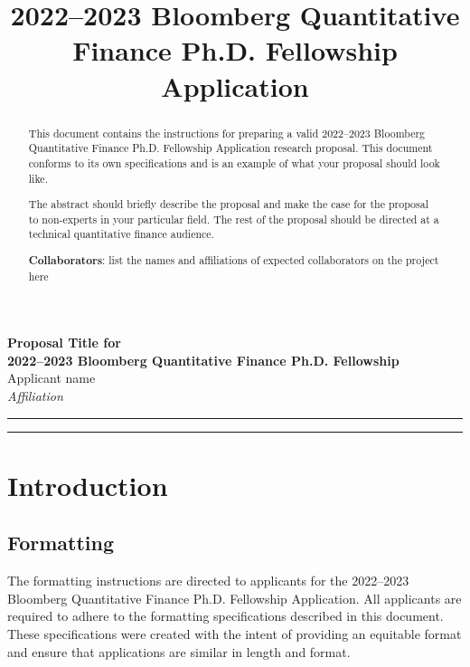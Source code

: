 \documentclass[10pt]{article}
\author{}
\title{2022--2023 Bloomberg Quantitative Finance Ph.D. Fellowship Application}
\begin{document}
	
	\begin{center}
		{\Large \textbf{Proposal Title for \\ 2022--2023 Bloomberg Quantitative Finance Ph.D. Fellowship}}\\
		\vspace{1em}
		{\large Applicant name}\\
		\vspace{1em}
		\textit{Affiliation}
	\end{center}
	

	\begin{center}
		\rule{150mm}{0.2mm}
	\end{center}		

	\begin{abstract}
	
	This document contains the instructions for preparing a valid 2022--2023 Bloomberg Quantitative Finance Ph.D. Fellowship Application research proposal. This document conforms to its own specifications and is an example of what your proposal should look like.
	
	The abstract should briefly describe the proposal and make the case for the proposal to non-experts in your particular field. The rest of the proposal should be directed at a technical quantitative finance audience.
	
	\textbf{Collaborators}: list the names and affiliations of expected collaborators on the project here
	\end{abstract}

	\begin{center}
		\rule{150mm}{0.2mm}
	\end{center}		

	\vspace{5mm}

\section{Introduction}
 
\subsection{Formatting} 
 
The formatting instructions are directed to applicants for the 2022--2023 Bloomberg Quantitative Finance Ph.D. Fellowship Application. All applicants are required to adhere to the formatting specifications described in this document. These specifications were created with the intent of providing an equitable format and ensure that applications are similar in length and format.
\end{document}
